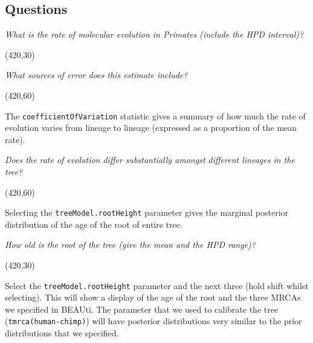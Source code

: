 \documentclass[12pt]{article}
\begin{document}
\newpage
\subsection*{Questions}
 \vspace{5 mm}

\textit{What is the rate of molecular evolution in Primates (include the HPD interval)?}

 \vspace{5 mm}
 \framebox(420,30){}
  \vspace{5 mm}


\textit{What sources of error does this estimate include?}
 
 \vspace{5 mm}
 \framebox(420,60){}
   \vspace{5 mm}
   
   The \texttt{coefficientOfVariation} statistic gives a summary of how much the rate of evolution varies from lineage to lineage (expressed as a proportion of the mean rate).
   
   \bigskip{}

\textit{Does the rate of evolution differ substantially amongst different lineages in the tree?}

 \vspace{5 mm}
 \framebox(420,60){}
   \vspace{5 mm}

Selecting the \texttt{treeModel.rootHeight} parameter gives the marginal posterior distribution of the age of the root of entire tree.

   \bigskip{}

\textit{How old is the root of the tree (give the mean and the HPD range)?}

 \vspace{5 mm}
 \framebox(420,30){}
   \vspace{5 mm}

Select the \texttt{treeModel.rootHeight} parameter and the next three (hold shift whilst selecting). This will show a display of the
age of the root and the three MRCAs we specified in BEAUti. The parameter that we used to calibrate the tree
(\texttt{tmrca(human-chimp)}) will have posterior distributions very similar to the prior distributions
that we specified. 

\medskip{}
\end{document}
